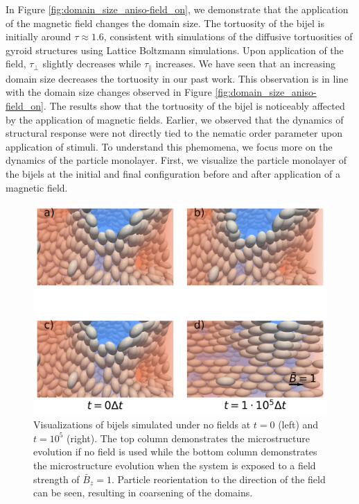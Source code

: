 In Figure \ref{fig:domain_size_aniso-field_on}, we demonstrate that the application of the magnetic field changes the 
domain size. The tortuosity of the bijel is initially around $\tau \approx 1.6$, consistent with simulations of the 
diffusive tortuosities of gyroid structures using Lattice Boltzmann simulations. \cite{luo_macroscopic_2020} 
Upon application of the field, $\tau_{\perp}$ slightly decreases while $\tau_{\parallel}$ increases. We have seen 
that an increasing domain size decreases the tortuosity in our past work. \cite{karthikeyan_formation_2024} This 
observation is in line with the domain size changes observed in Figure \ref{fig:domain_size_aniso-field_on}. The 
results show that the tortuosity of the bijel is noticeably affected by the application of magnetic fields. 
Earlier, we observed that the dynamics of structural response were not directly tied to the nematic order 
parameter upon application of stimuli. To understand this phemomena, we focus more on the dynamics of the 
particle monolayer. First, we visualize the particle monolayer of the bijels at the initial and final configuration 
before and after application of a magnetic field.

\begin{figure} 
    \centering 
    \includegraphics[width=\columnwidth]{../figures/results/paper2/particle_viz-field_on.png} 
    \caption{Visualizations of bijels simulated under no fields at $t = 0$ (left) and $t = 10^5$ (right). 
            The top column demonstrates the microstructure evolution if no field is used while the bottom column 
            demonstrates the microstructure evolution when the system is exposed to a field strength of $\bar{B}_z = 1$. 
            Particle reorientation to the direction of the field can be seen, resulting in coarsening of the domains.} 
    \label{fig:particle_viz-field_on} 
\end{figure}

